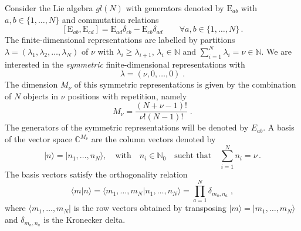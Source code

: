 \documentclass[10pt]{article}
\numberwithin{equation}{section}
\numberwithin{equation}{subsection}
\newcommand{\co}{\;,}
\newcommand{\dt}{\;.}
\newcommand{\EE}{\mathrm{E}}
\newcommand{\twoj}{\nu}
\begin{document}
Consider the Lie algebra $gl(N)$ with generators denoted by $\EE_{ab}$ with $a,b\in \{1,\ldots,N\}$ and commutation relations
\begin{equation}\label{eq:comgl}
\left[\EE_{ab},\EE_{cd}\right]=\EE_{ad}\delta_{cb}-\EE_{cb}\delta_{ad}\qquad \forall a,b\in \{1,\ldots,N\}\,.
\end{equation}
The finite-dimensional representations are labelled by partitions $\lambda=(\lambda_1,\lambda_2,\ldots,\lambda_N)$ of $\nu$ with  $\lambda_i\geq \lambda_{i+1}$,  $\lambda_i\in \mathbb{N}$ and $\sum_{i=1}^N \lambda_i = \nu\in\mathbb{N}$.  
We are interested in the {\em symmetric} finite-dimensional representations with 
\begin{equation}\label{eq:dynkin}
    \lambda=(\twoj,0,\ldots,0) \;.
\end{equation} 
The dimension $M_\twoj$ of this symmetric representations is given by the combination of $N$ objects in $\twoj$ positions with repetition, namely
\begin{equation}
	M_\twoj= \frac{(N+\twoj-1)!}{\twoj  !(N-1)!}\dt
\end{equation} 
The generators of the symmetric representations will be denoted by $E_{ab}$.
A basis of the vector space $\mathbb{C}^{M_\twoj}$ are the column vectors denoted by
\begin{equation}
  |n\rangle=  |n_{1},\ldots,n_{N}\rangle,\quad \text{with}\quad n_{i}\in\mathbb{N}_{0}\quad \text{sucht that}\quad \sum_{i=1}^{N}n_{i}=\nu\,.
\end{equation}
The basis vectors satisfy the orthogonality relation
\begin{equation}\label{ortho}
   \langle m|n \rangle =\langle m_{1},\ldots,m_{N}|n_{1},\ldots,n_{N}\rangle=\prod_{a=1}^{N}\delta_{m_{a},n_{a}}\co
\end{equation}
where  $ \langle m_{1},\ldots,m_{N}|$ is the row vectors obtained by transposing $|m\rangle=|m_{1},\ldots,m_{N}\rangle$ and $\delta_{m_{a},n_{a}}$ is the Kronecker delta. 
\end{document}
